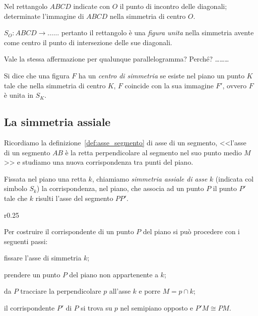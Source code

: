 \begin{exrig}
\begin{esempio}
Nel rettangolo $ABCD$ indicate con $O$ il punto di incontro delle 
diagonali; determinate l'immagine di $ABCD$ nella simmetria di centro 
$O$.

$S_O:ABCD \rightarrow \ldots\ldots{}$ pertanto il rettangolo è una 
\emph{figura unita} nella simmetria avente come centro il punto di 
intersezione delle sue diagonali.

\begin{figure*}[!htb]
    \centering
\end{figure*}

Vale la stessa affermazione per qualunque parallelogramma? Perché? 
\ldots\ldots\ldots{}

\begin{figure*}[!htb]
    \centering
\end{figure*}

\end{esempio}
\end{exrig}

\begin{definizione}
Si dice che una figura $F$ ha un \emph{centro di simmetria} se esiste 
nel piano un punto $K$ tale che nella simmetria di centro $K$, $F$ 
coincide con la sua immagine $F'$, ovvero $F$ è unita in $S_K$. 
\end{definizione}

\subsection{La simmetria assiale}

Ricordiamo la definizione~\ref{def:asse_segmento} di asse di un 
segmento, <<l'asse di un segmento $AB$ è la retta perpendicolare al 
segmento nel suo punto medio $M$>> e studiamo una nuova 
corrispondenza tra punti del piano.

\begin{definizione}
Fissata nel piano una retta $k$, chiamiamo \emph{simmetria assiale di 
asse $k$} (indicata col simbolo $S_k$) la corrispondenza, nel piano, 
che associa ad un punto $P$ il punto $P'$ tale che $k$ risulti l'asse 
del segmento $PP'$.
\end{definizione}

\setlength{\intextsep}{3pt plus 2.0pt minus 2.0pt}
\begin{wrapfigure}{r}{0.25\textwidth}
	\centering
\end{wrapfigure}
Per costruire il corrispondente di un punto $P$ del piano si può 
procedere con i seguenti passi:
\begin{enumerate*}
\item fissare l'asse di simmetria $k$;
\item prendere un punto $P$ del piano non appartenente a $k$;
\item da $P$ tracciare la perpendicolare $p$ all'asse $k$ e porre 
$M=p\cap k$;
\item il corrispondente $P'$ di $P$ si trova su $p$ nel semipiano 
opposto e $P'M\cong PM$.
\end{enumerate*}

